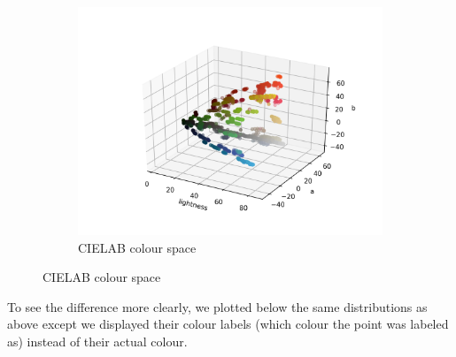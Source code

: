 \documentclass[12pt,a4paper]{article}
\begin{document}
\begin{center}
\begin{figure}[H]
\begin{subfigure}{.5\linewidth}
				\includegraphics[width=\linewidth]{images/lab.png}
				\caption{CIELAB colour space}
			\end{subfigure}
		\end{figure}
	\end{center}

	To see the difference more clearly, we plotted below the same distributions as above except we displayed their colour labels (which colour the point was labeled as) instead of their actual colour.
\end{document}
